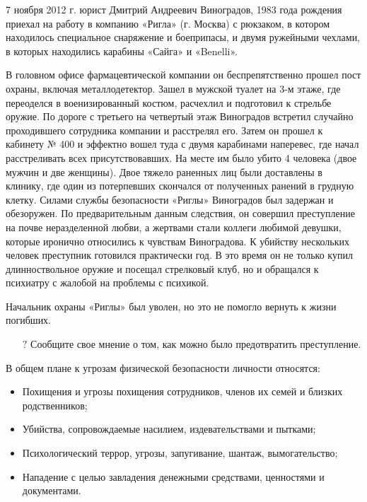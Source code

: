 \documentclass[a4paper,12pt,fleqn]{article} %
\begin{document}
\begin{tcolorbox}[colback=blue!55!red!5!,colframe=blue!55!red,enforce breakable,%
	pad at break=1mm, title=Кейс 28. Действия обиженного сотрудника]
	
	7 ноября 2012 г. юрист Дмитрий Андреевич Виноградов, 1983 года рождения приехал на работу в компанию «Ригла» (г. Москва) с рюкзаком, в котором находилось специальное снаряжение и боеприпасы, и двумя ружейными чехлами, в которых находились карабины «Сайга» и «Benelli».
	
	В головном офисе фармацевтической компании он беспрепятственно прошел пост охраны, включая металлодетектор. Зашел в мужской туалет на 3-м этаже, где переоделся в военизированный костюм, расчехлил и подготовил к стрельбе оружие. По дороге с третьего на четвертый этаж Виноградов встретил случайно проходившего сотрудника компании и расстрелял его. Затем он прошел к кабинету № 400 и эффектно вошел туда с двумя карабинами наперевес, где начал расстреливать всех присутствовавших. На месте им было убито 4 человека (двое мужчин и две женщины). Двое тяжело раненных лиц были доставлены в клинику, где один из потерпевших скончался от полученных ранений в грудную клетку. Силами службы безопасности «Риглы» Виноградов был задержан и обезоружен. По предварительным данным следствия, он совершил преступление на почве неразделенной любви, а жертвами стали коллеги любимой девушки, которые иронично относились к чувствам Виноградова. К убийству нескольких человек преступник готовился практически год. В это время он не только купил длинноствольное оружие и посещал стрелковый клуб, но и обращался к психиатру с жалобой на проблемы с психикой. 
	
	Начальник охраны «Риглы» был уволен, но это не помогло вернуть к жизни погибших.

\begin{itemize}
	\item[{\color{blue!55!red}\Huge {  $ ? $}} \quad]   Сообщите свое мнение о том, как можно было предотвратить преступление.
\end{itemize}	
	
\end{tcolorbox}

В общем плане к угрозам физической безопасности личности относятся: 
\begin{itemize}
	\item Похищения и угрозы похищения сотрудников, членов их семей и близких родственников; 
	\item Убийства, сопровождаемые насилием, издевательствами и пытками; 
	\item Психологический террор, угрозы, запугивание, шантаж, вымогательство; 
	\item Нападение с целью завладения денежными средствами, ценностями и документами. 
\end{itemize}
\end{document}
